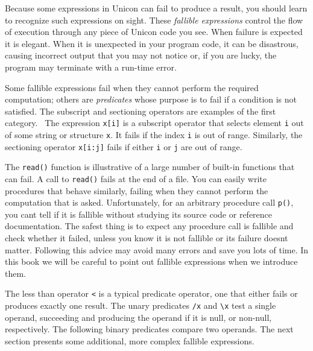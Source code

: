 Because some expressions in Unicon can fail to
produce a result, you should learn to recognize such expressions on
sight. These \textit{fallible
expression}\textit{s} control the flow of execution through any piece
of Unicon code you see. When failure is expected it is elegant. When it
is unexpected in your program code, it can be disastrous, causing
incorrect output that you may not notice or, if you are lucky, the
program may terminate with a run-time error.

Some fallible expressions fail when they cannot perform the required
computation; others are \textit{predicates} whose purpose is to fail if
a condition is not satisfied. The subscript and sectioning operators are examples of the first category. \ The
expression \texttt{x[i]} is a subscript
operator that selects element \texttt{i} out of some string or
structure \texttt{x}. It fails if the index \texttt{i} is out of range.
Similarly, the sectioning operator \texttt{x[i:j]} fails if either
\texttt{i} or \texttt{j} are out of range.

The \texttt{read()} function is illustrative of a large number of
built-in functions that can fail. A call to \texttt{read()} fails at
the end of a file. You can easily write procedures that behave
similarly, failing when they cannot perform the computation that is
asked. Unfortunately, for an arbitrary procedure call \texttt{p()}, you
can{\textquotesingle}t tell if it is fallible without studying its
source code or reference documentation. The safest
thing is to expect any procedure call is fallible and check whether it
failed, unless you know it is not fallible or its failure
doesn{\textquotesingle}t matter. Following this advice may avoid many
errors and save you lots of time. In this book we will be careful to
point out fallible expressions when we introduce them.

The less than operator \texttt{{\textless}} is a typical predicate
operator, one that either fails or produces exactly one result. The
unary predicates \texttt{/x} and \texttt{{\textbackslash}x} test a single
operand, succeeding and producing the operand if it is null, or
non-null, respectively. The following binary predicates compare two
operands. The next section presents some additional, more complex
fallible expressions.

\bigskip

